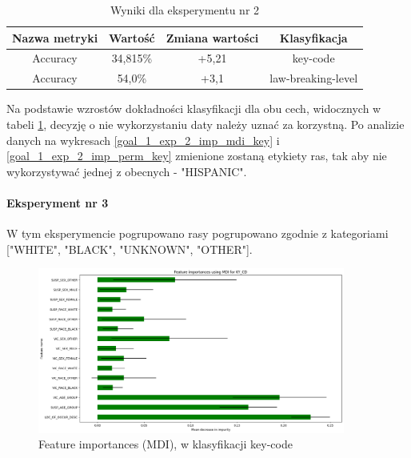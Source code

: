\documentclass{classrep}
\begin{document}
{{{{                    \begin{table}
                    \centering
                     \begin{tabular}{|c|c|c|c|}
                            \hline
                          Nazwa metryki & Wartość & Zmiana wartości & Klasyfikacja \\ \hline
                            Accuracy &  34,815\% & +5,21 & key-code\\ \hline
                            Accuracy &  54,0\% & +3,1 & law-breaking-level\\ \hline
                        \end{tabular}
                        \caption{Wyniki dla eksperymentu nr 2}
                        \label{goal_1_exp_2_results}
                     \end{table}
                     \FloatBarrier
                     
                     Na podstawie wzrostów dokładności klasyfikacji dla obu cech, widocznych w tabeli \ref{goal_1_exp_2_results}, decyzję o nie wykorzystaniu daty należy uznać za korzystną. Po analizie danych na wykresach \ref{goal_1_exp_2_imp_mdi_key} i \ref{goal_1_exp_2_imp_perm_key} zmienione zostaną etykiety ras, tak aby nie wykorzystywać jednej z obecnych - "HISPANIC".
                }
                \paragraph{Eksperyment nr 3}{
                    W tym eksperymencie pogrupowano rasy pogrupowano zgodnie z kategoriami ["WHITE", "BLACK", "UNKNOWN", "OTHER"].
                    \begin{figure}[!htbp]
                        \centering
                        \includegraphics[width=0.9\textwidth]{img/5.1.3/3/Feature importances using MDI for KY_CD.png}
                        \caption{Feature importances (MDI), w klasyfikacji key-code}
                        \label{goal_1_exp_3_imp_mdi_key}
                    \end{figure}
                    
}}}}
\end{document}
